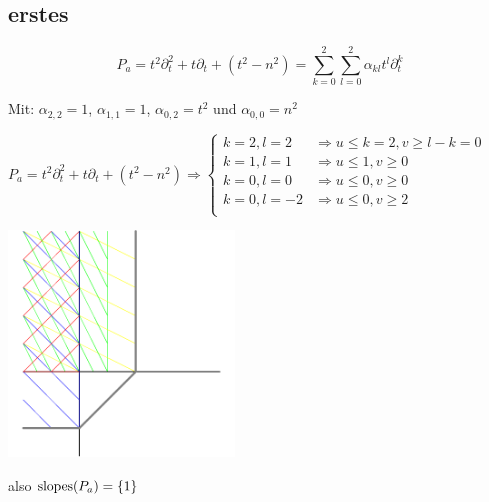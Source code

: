 \subsection{erstes}
\[
  P_a=t^2\partial_t^2+t\partial_t+(t^2-n^2)=\sum_{k=0}^2\sum_{l=0}^2
  \alpha_{kl}t^l\partial_t^k
\]

Mit: $\alpha_{2,2}=1$, $\alpha_{1,1}=1$, $\alpha_{0,2}=t^2$ und
$\alpha_{0,0}=n^2$

$
P_a=t^2\partial_t^2+t\partial_t+(t^2-n^2) \Rightarrow 
\begin{cases}
  k=2,l=2 & \Rightarrow u\leq k=2, v\geq l-k=0\\
  k=1,l=1 & \Rightarrow u\leq 1, v\geq 0\\
  k=0,l=0 & \Rightarrow u\leq 0, v\geq 0\\
  k=0,l=-2 & \Rightarrow u\leq 0, v\geq 2\\
\end{cases}
$

\begin{center}
  \includegraphics[width=6cm]{beispiele/img/a.png}
\end{center}
also $\operatorname{slopes}(P_a)=\{1\}$

